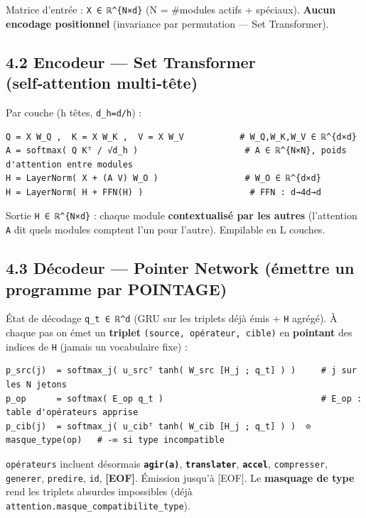 \documentclass[
  french,
  11pt,
]{article}
\begin{document}
Matrice d'entrée : \texttt{X\ ∈\ ℝ\^{}\{N×d\}} (N = \#modules actifs +
spéciaux). \textbf{Aucun encodage positionnel} (invariance par
permutation --- Set Transformer).

\subsection{4.2 Encodeur --- Set Transformer (self‑attention
multi‑tête)}\label{encodeur-set-transformer-selfattention-multituxeate}

Par couche (h têtes, \texttt{d\_h=d/h}) :

\begin{verbatim}
Q = X W_Q ,  K = X W_K ,  V = X W_V           # W_Q,W_K,W_V ∈ ℝ^{d×d}
A = softmax( Q Kᵀ / √d_h )                     # A ∈ ℝ^{N×N}, poids d'attention entre modules
H = LayerNorm( X + (A V) W_O )                 # W_O ∈ ℝ^{d×d}
H = LayerNorm( H + FFN(H) )                     # FFN : d→4d→d
\end{verbatim}

Sortie \texttt{H\ ∈\ ℝ\^{}\{N×d\}} : chaque module \textbf{contextualisé
par les autres} (l'attention \texttt{A} dit quels modules comptent l'un
pour l'autre). Empilable en L couches.

\subsection{4.3 Décodeur --- Pointer Network (émettre un programme par
POINTAGE)}\label{duxe9codeur-pointer-network-uxe9mettre-un-programme-par-pointage}

État de décodage \texttt{q\_t\ ∈\ ℝ\^{}d} (GRU sur les triplets déjà
émis + \texttt{H} agrégé). À chaque pas on émet un \textbf{triplet}
\texttt{(source,\ opérateur,\ cible)} en \textbf{pointant} des indices
de \texttt{H} (jamais un vocabulaire fixe) :

\begin{verbatim}
p_src(j)  = softmax_j( u_srcᵀ tanh( W_src [H_j ; q_t] ) )     # j sur les N jetons
p_op      = softmax( E_op q_t )                               # E_op : table d'opérateurs apprise
p_cib(j)  = softmax_j( u_cibᵀ tanh( W_cib [H_j ; q_t] ) )  ⊙  masque_type(op)   # -∞ si type incompatible
\end{verbatim}

\texttt{opérateurs} incluent désormais \textbf{\texttt{agir(a)}},
\textbf{\texttt{translater}}, \textbf{\texttt{accel}},
\texttt{compresser}, \texttt{generer}, \texttt{predire}, \texttt{id},
\textbf{{[}EOF{]}}. Émission jusqu'à {[}EOF{]}. Le \textbf{masquage de
type} rend les triplets absurdes impossibles (déjà
\texttt{attention.masque\_compatibilite\_type}).
\end{document}
